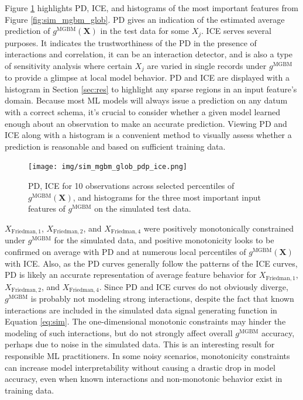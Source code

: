 \documentclass[information,article,submit,moreauthors,pdftex]{definitions/mdpi}
\begin{document}
Figure \ref{fig:sim_mgbm_glob_pdp_ice} highlights PD, ICE, and histograms of the most important features from Figure \ref{fig:sim_mgbm_glob}. PD gives an indication of the estimated average prediction of $g^\text{MGBM}(\mathbf{X})$ in the test data for some $X_j$. ICE serves several purposes. It indicates the trustworthiness of the PD in the presence of interactions and correlation, it can be an interaction detector, and is also a type of sensitivity analysis where certain $X_j$ are varied in single records under $g^\text{MGBM}$ to provide a glimpse at local model behavior. PD and ICE are displayed with a histogram in Section \ref{sec:res} to highlight any sparse regions in an input feature's domain. Because most ML models will always issue a prediction on any datum with a correct schema, it's crucial to consider whether a given model learned enough about an observation to make an accurate prediction. Viewing PD and ICE along with a histogram is a convenient method to visually assess whether a prediction is reasonable and based on sufficient training data.

\begin{figure}[H]
\centering
\texttt{[image: img/sim\_mgbm\_glob\_pdp\_ice.png]}
\caption{PD, ICE for 10 observations across selected percentiles of $g^\text{MGBM}(\mathbf{X})$, and histograms for the three most important input features of $g^\text{MGBM}$ on the simulated test data.}
\label{fig:sim_mgbm_glob_pdp_ice}
\end{figure}   

$X_{\text{Friedman},1}$, $X_{\text{Friedman},2}$, and $X_{\text{Friedman},4}$ were positively monotonically constrained under $g^\text{MGBM}$ for the simulated data, and positive monotonicity looks to be confirmed on average with PD and at numerous local percentiles of $g^\text{MGBM}(\mathbf{X})$ with ICE. Also, as the PD curves generally follow the patterns of the ICE curves, PD is likely an accurate representation of average feature behavior for $X_{\text{Friedman},1}$, $X_{\text{Friedman},2}$, and $X_{\text{Friedman},4}$. Since PD and ICE curves do not obviously diverge, $g^\text{MGBM}$ is probably not modeling strong interactions, despite the fact that known interactions are included in the simulated data signal generating function in Equation \ref{eq:sim}. The one-dimensional monotonic constraints may hinder the modeling of such interactions, but do not strongly affect overall $g^\text{MGBM}$ accuracy, perhaps due to noise in the simulated data. This is an interesting result for responsible ML practitioners. In some noisy scenarios, monotonicity constraints can increase model interpretability without causing a drastic drop in model accuracy, even when known interactions and non-monotonic behavior exist in training data.
\end{document}
